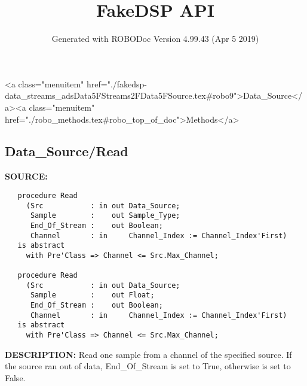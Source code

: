 \documentclass{article}
\title{FakeDSP API}
\author{Generated with ROBODoc Version 4.99.43 (Apr  5 2019)
}
\begin{document}
\maketitle
\printindex
\tableofcontents
\newpage

<a class="menuitem" href="./fakedsp-data_streams_adsData5FStreams2FData5FSource.tex#robo9">Data_Source</a><a class="menuitem" href="./robo_methods.tex#robo_top_of_doc">Methods</a>\subsection{Data\_Source/Read}
\textbf{SOURCE:}\hspace{0.08in}\begin{verbatim}
   procedure Read
     (Src           : in out Data_Source;
      Sample        :    out Sample_Type;
      End_Of_Stream :    out Boolean;
      Channel       : in     Channel_Index := Channel_Index'First)
   is abstract
     with Pre'Class => Channel <= Src.Max_Channel;

   procedure Read
     (Src           : in out Data_Source;
      Sample        :    out Float;
      End_Of_Stream :    out Boolean;
      Channel       : in     Channel_Index := Channel_Index'First)
   is abstract
     with Pre'Class => Channel <= Src.Max_Channel;
\end{verbatim}
\textbf{DESCRIPTION:}\hspace{0.08in}
   Read one sample from a channel of the specified source. If
   the source ran out of data, End\_Of\_Stream is set to True, otherwise
   is set to False.
\end{document}
